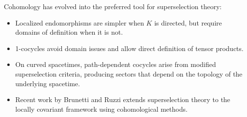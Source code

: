 \documentclass[11pt,a4paper]{article}
\begin{document}
Cohomology has evolved into the preferred tool for superselection theory:
\begin{itemize}[nosep]
  \item Localized endomorphisms are simpler when $K$ is directed, but
        require domains of definition when it is not.
  \item 1-cocycles avoid domain issues and allow direct definition of
        tensor products.
  \item On curved spacetimes, path-dependent cocycles arise from modified
        superselection criteria, producing sectors that depend on the
        topology of the underlying spacetime.
  \item Recent work by Brunetti and Ruzzi extends superselection theory
        to the locally covariant framework using cohomological methods.
\end{itemize}
\end{document}
